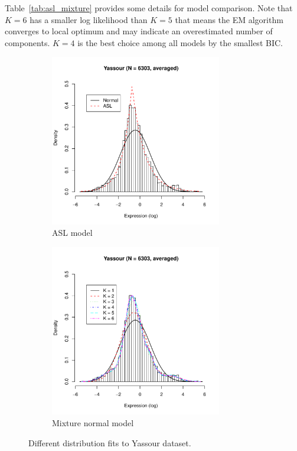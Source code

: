 Table~\ref{tab:asl_mixture}
provides some details for model comparison. Note that $K=6$ has
a smaller log likelihood than $K=5$ that means the EM algorithm
converges to local optimum and may indicate an overestimated number of
components. $K = 4$ is the best choice among all models by the smallest
BIC.

\begin{figure}[h]
  \centering
  \begin{subfigure}[b]{.45\textwidth}
    \centering
    \includegraphics[height=7.5cm,width=7.5cm]{cubfits-include/figure/more_asl}
    \caption{ASL model}
    \label{fig:asl}
  \end{subfigure}
  \begin{subfigure}[b]{.45\textwidth}
    \centering
    \includegraphics[height=7.5cm,width=7.5cm]{cubfits-include/figure/more_mixture}
    \caption{Mixture normal model}
    \label{fig:mixture}
  \end{subfigure}
  \caption{Different distribution fits to Yassour dataset.}
  \label{fig:asl_mixture}
\end{figure}

